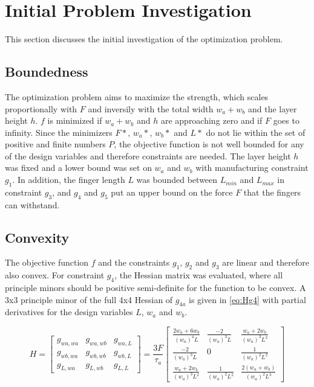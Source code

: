 \section{Initial Problem Investigation}
This section discusses the initial investigation of the optimization problem. 

\subsection{Boundedness}
The optimization problem aims to maximize the strength, which scales proportionally with $F$ and inversily with the total width $w_a + w_b$ and the layer height $h$.  $f$ is minimized if $w_a + w_b$ and $h$ are approaching zero and if $F$ goes to infinity. Since the minimizers $F*$, $w_a*$, $w_b*$ and $L*$ do not lie within the set of positive and finite numbers $P$, the objective function is not well bounded for any of the design variables and therefore constraints are needed. The layer height $h$ was fixed and a lower bound was set on $w_a$ and $w_b$ with manufacturing constraint $g_1$. In addition, the finger length $L$ was bounded between $L_{min}$ and $L_{max}$ in constraint $g_3$, and $g_4$ and $g_5$ put an upper bound on the force $F$ that the fingers can withstand. 

\subsection{Convexity}
The objective function $f$ and the constraints $g_1$, $g_2$ and $g_3$ are linear and therefore also convex. For constraint $g_4$, the Hessian matrix was evaluated, where all principle minors should be positive semi-definite for the function to be convex. A 3x3 principle minor of the full 4x4 Hessian of $g_{4a}$ is given in \autoref{eq:Hg4} with partial derivatives for the design variables $L$, $w_a$ and $w_b$.

\begin{equation}
	\label{eq:Hg4}
	H = \begin{bmatrix}
				 g_{wa, wa} & g_{wa, wb} & g_{wa, L} \\
				 g_{wb, wa} & g_{wb, wb} & g_{wb, L}  \\
				 g_{L, wa} & g_{L, wb} & g_{L, L} 													
		\end{bmatrix}
	= \frac{3F}{\tau_a}\begin{bmatrix}
		\frac{2w_a + 6 w_b}{\left( w_a \right)^4 L} & \frac{-2}{\left( w_a \right)^3 L } &  \frac{w_a + 2 w_b}{\left( w_a \right)^3 L^2 }\\
		\frac{-2}{\left( w_a \right)^3 L } & 0 & \frac{1}{\left( w_a \right)^2 L^2 }  \\
\frac{w_a + 2 w_b}{\left( w_a \right)^3 L^2 } & \frac{1}{\left( w_a \right)^2 L^2 } & \frac{2 \left(w_a + w_b\right)}{\left( w_a \right)^2 L^3}													
	\end{bmatrix}
\end{equation}

